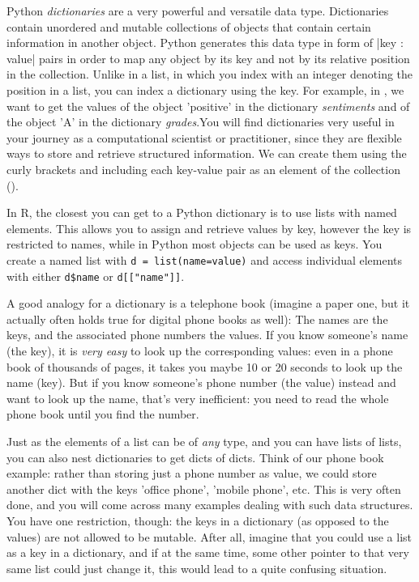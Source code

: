 Python \emph{dictionaries} are a very powerful and versatile data type.
Dictionaries contain unordered and mutable collections of objects that
contain certain information in another object. Python generates this
data type in form of |{key : value}| pairs in order
to map any object by its key and not by its relative position in the
collection. Unlike in a list, in which you index with an integer denoting
the position in a list, you can index a dictionary using the key.
For example, in , we want to get the values of the object 'positive' in the
dictionary \emph{sentiments} and of the object 'A' in the dictionary
\emph{grades}.You will
find dictionaries very useful in your journey as a computational
scientist or practitioner, since they are flexible ways to store and
retrieve structured information. We can create them using the curly
brackets {} and including each key-value pair as an element of the
collection ().

In R, the closest you can get to a Python dictionary is to use lists with named elements.
This allows you to assign and retrieve values by key,
however the key is restricted to names, while in Python most objects can be used as keys.
You create a named list with \verb|d = list(name=value)| and access individual elements with either
\verb|d$name| or \verb|d[["name"]]|. 


A good analogy for a dictionary is a telephone book (imagine a paper
one, but it actually often holds true for digital phone books as
well): The names are the keys, and the associated phone numbers the
values. If you know someone's name (the key), it is \emph{very easy}
to look up the corresponding values: even in a phone book of thousands
of pages, it takes you maybe 10 or 20 seconds to look up the name
(key). But if you know someone's phone number (the value) instead and
want to look up the name, that's very inefficient: you need to read
the whole phone book until you find the number.

Just as the elements of a list can be of \emph{any} type, and you can
have lists of lists, you can also nest dictionaries to get dicts of
dicts. Think of our phone book example: rather than storing just a
phone number as value, we could store another dict with the keys
'office phone', 'mobile phone', etc. This is very often done, and you
will come across many examples dealing with such data structures.
You have one restriction, though: the keys in a dictionary (as opposed
to the values) are not allowed to be mutable. After all, imagine that
you could use a list as a key in a dictionary, and if at the same time,
some other pointer to that very same list could just change it, this
would lead to a quite confusing situation.




